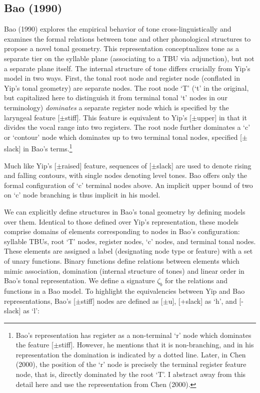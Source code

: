 \documentclass{article}
\begin{document}
\subsection{Bao (1990)}
Bao (1990) explores the empirical behavior of tone cross-linguistically and examines the formal relations between tone and other phonological structures to propose a novel tonal geometry. This representation conceptualizes tone as a separate tier on the syllable plane (associating to a TBU via adjunction), but not a separate plane itself. The internal structure of tone differs crucially from Yip's model in two ways. First, the tonal root node and register node (conflated in Yip's tonal geometry) are separate nodes. The root node `T' (`t' in the original, but capitalized here to distinguish it from terminal tonal `t' nodes in our terminology) \emph{dominates} a separate register node which is specified by the laryngeal feature [$\pm$stiff]. This feature is equivalent to Yip's [$\pm$upper] in that it divides the vocal range into two registers. The root node further dominates a `c' or `contour' node which dominates up to two terminal tonal nodes, specified [$\pm$slack] in Bao's terms.\footnote{Bao's representation has register as a non-terminal `r' node which dominates the feature [$\pm$stiff]. However, he mentions that it is non-branching, and in his representation the domination is indicated by a dotted line. Later, in Chen (2000), the position of the `r' node is precisely the terminal register feature node, that is, directly dominated by the root `T'. I abstract away from this detail here and use the representation from Chen (2000).}
\begin{center}
\end{center}
Much like Yip's [$\pm$raised] feature, sequences of [$\pm$slack] are used to denote rising and falling contours, with single nodes denoting level tones. Bao offers only the formal configuration of `c' terminal nodes above. An implicit upper bound of two on `c' node branching is thus implicit in his model. \par
We can explicitly define structures in Bao's tonal geometry by defining models over them. Identical to those defined over Yip's representation, these models comprise domains of elements corresponding to nodes in Bao's configuration: syllable TBUs, root `T' nodes, register nodes, `c' nodes, and terminal tonal nodes. These elements are assigned a label (designating node type or feature) with a set of unary functions. Binary functions define relations between elements which mimic association, domination (internal structure of tones) and linear order in Bao's tonal representation. We define a signature $\zeta_{b}$ for the relations and functions in a Bao model. To highlight the equivalencies between Yip and Bao representations, Bao's [$\pm$stiff] nodes are defined as [$\pm$u], [+slack] as `h', and [-slack] as `l': 
\end{document}
